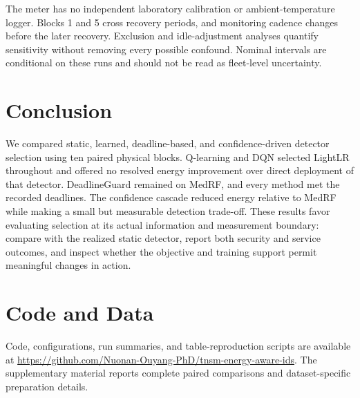 \documentclass[journal]{IEEEtran}
\begin{document}
The meter has no independent laboratory calibration or ambient-temperature logger. Blocks 1 and 5 cross recovery periods, and monitoring cadence changes before the later recovery. Exclusion and idle-adjustment analyses quantify sensitivity without removing every possible confound. Nominal intervals are conditional on these runs and should not be read as fleet-level uncertainty.

\section{Conclusion}\label{sec:conclusion}
We compared static, learned, deadline-based, and confidence-driven detector selection using ten paired physical blocks. Q-learning and DQN selected LightLR throughout and offered no resolved energy improvement over direct deployment of that detector. DeadlineGuard remained on MedRF, and every method met the recorded deadlines. The confidence cascade reduced energy relative to MedRF while making a small but measurable detection trade-off. These results favor evaluating selection at its actual information and measurement boundary: compare with the realized static detector, report both security and service outcomes, and inspect whether the objective and training support permit meaningful changes in action.

\section*{Code and Data}
Code, configurations, run summaries, and table-reproduction scripts are available at \url{https://github.com/Nuonan-Ouyang-PhD/tnsm-energy-aware-ids}. The supplementary material reports complete paired comparisons and dataset-specific preparation details.

\end{document}
